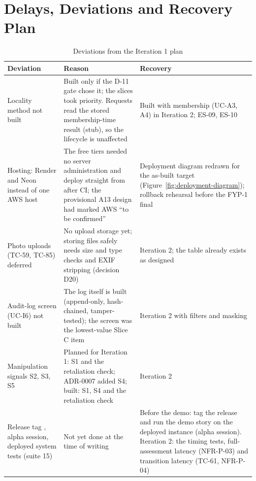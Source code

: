 \section{Delays, Deviations and Recovery Plan}\label{sec:delays-deviations-recovery-plan}
\begin{table}[H]
\centering
\caption{Deviations from the Iteration 1 plan}\label{tab:deviations-from-iteration-1}
\begin{tabular}{@{}L{115pt}L{132pt}L{128pt}@{}}
\toprule
Deviation & Reason & Recovery \\
\midrule
Locality method not built & Built only if the D-11 gate chose it; the slices took priority. Requests read the stored membership-time result (stub), so the lifecycle is unaffected & Built with membership (UC-A3, A4) in Iteration 2; ES-09, ES-10 \\
Hosting: Render and Neon instead of one AWS host & The free tiers needed no server administration and deploy straight from  after CI; the provisional A13 design had marked AWS ``to be confirmed'' & Deployment diagram redrawn for the as-built target (Figure~\ref{fig:deployment-diagram}); rollback rehearsal before the FYP-1 final \\
Photo uploads (TC-59, TC-85) deferred & No upload storage yet; storing files safely needs size and type checks and EXIF stripping (decision D20) & Iteration 2; the  table already exists as designed \\
Audit-log screen (UC-I6) not built & The log itself is built (append-only, hash-chained, tamper-tested); the screen was the lowest-value Slice C item & Iteration 2 with filters and masking \\
Manipulation signals S2, S3, S5 & Planned for Iteration 1: S1 and the retaliation check; ADR-0007 added S4; built: S1, S4 and the retaliation check & Iteration 2 \\
Release tag , alpha session, deployed system tests (suite 15) & Not yet done at the time of writing & Before the demo: tag the release and run the demo story on the deployed instance (alpha session). Iteration 2: the timing tests, full-assessment latency (NFR-P-03) and transition latency (TC-61, NFR-P-04) \\
\bottomrule
\end{tabular}
\end{table}
